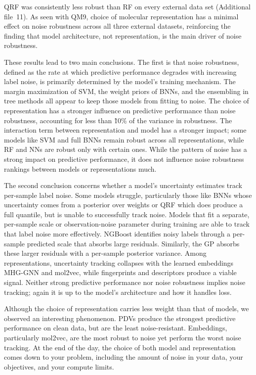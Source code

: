 \documentclass[pdflatex,sn-basic]{sn-jnl}%
\theoremstyle{thmstyleone}%
\theoremstyle{thmstyletwo}%
\theoremstyle{thmstylethree}%
\begin{document}
QRF was consistently less robust than RF on every external data set (Additional file~11). As seen with QM9, choice of molecular representation has a minimal effect on noise robustness across all three external datasets, reinforcing the finding that model architecture, not representation, is the main driver of noise robustness. 

These results lead to two main conclusions. The first is that noise robustness, defined as the rate at which predictive performance degrades with increasing label noise, is primarily determined by the model's training mechanism. The margin maximization of SVM, the weight priors of BNNs, and the ensembling in tree methods all appear to keep those models from fitting to noise. The choice of representation has a stronger influence on predictive performance than noise robustness, accounting for less than \~10\% of the variance in robustness. The interaction term between representation and model has a stronger impact; some models like SVM and full BNNs remain robust across all representations, while RF and NNs are robust only with certain ones. While the pattern of noise has a strong impact on predictive performance, it does not influence noise robustness rankings between models or representations much.

The second conclusion concerns whether a model's uncertainty estimates track per-sample label noise. Some models struggle, particularly those like BNNs whose uncertainty comes from a posterior over weights or QRF which does produce a full quantile, but is unable to successfully track noise. 
Models that fit a separate, per-sample scale or observation-noise parameter during training are able to track that label noise more effectively. NGBoost identifies noisy labels through a per-sample predicted scale that absorbs large residuals. Similarly, the GP absorbs these larger residuals with a per-sample posterior variance. Among representations, uncertainty tracking collapses with the learned embeddings MHG-GNN and mol2vec, while fingerprints and descriptors produce a viable signal. Neither strong predictive performance nor noise robustness implies noise tracking; again it is up to the model's architecture and how it handles loss. 

Although the choice of representation carries less weight than that of models, we observed an interesting phenomenon. PDVs produce the strongest predictive performance on clean data, but are the least noise-resistant. Embeddings, particularly mol2vec, are the most robust to noise yet perform the worst noise tracking. At the end of the day, the choice of both model and representation comes down to your problem, including the amount of noise in your data, your objectives, and your compute limits. 
\end{document}
